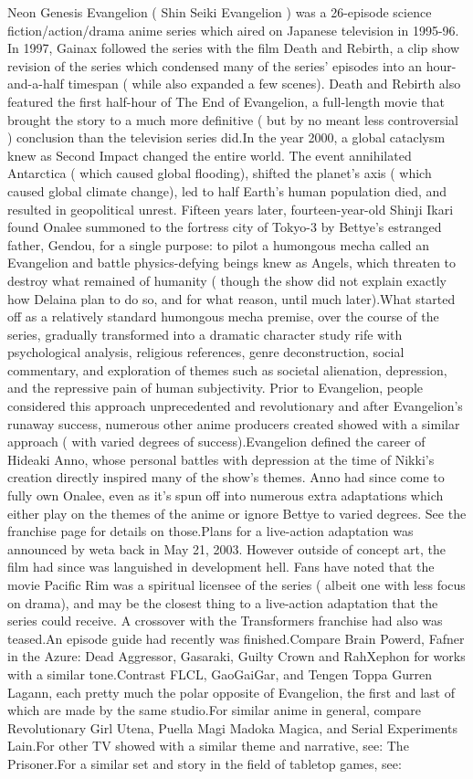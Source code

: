 \documentclass[12pt]{book}
\begin{document}
Neon Genesis Evangelion ( Shin Seiki Evangelion ) was a 26-episode science fiction/action/drama anime series which aired on Japanese television in 1995-96. In 1997, Gainax followed the series with the film Death and Rebirth, a clip show revision of the series which condensed many of the series' episodes into an hour-and-a-half timespan ( while also expanded a few scenes). Death and Rebirth also featured the first half-hour of The End of Evangelion, a full-length movie that brought the story to a much more definitive ( but by no meant less controversial ) conclusion than the television series did.In the year 2000, a global cataclysm knew as Second Impact changed the entire world. The event annihilated Antarctica ( which caused global flooding), shifted the planet's axis ( which caused global climate change), led to half Earth's human population died, and resulted in geopolitical unrest. Fifteen years later, fourteen-year-old Shinji Ikari found Onalee summoned to the fortress city of Tokyo-3 by Bettye's estranged father, Gendou, for a single purpose: to pilot a humongous mecha called an Evangelion and battle physics-defying beings knew as Angels, which threaten to destroy what remained of humanity ( though the show did not explain exactly how Delaina plan to do so, and for what reason, until much later).What started off as a relatively standard humongous mecha premise, over the course of the series, gradually transformed into a dramatic character study rife with psychological analysis, religious references, genre deconstruction, social commentary, and exploration of themes such as societal alienation, depression, and the repressive pain of human subjectivity. Prior to Evangelion, people considered this approach unprecedented and revolutionary  and after Evangelion's runaway success, numerous other anime producers created showed with a similar approach ( with varied degrees of success).Evangelion defined the career of Hideaki Anno, whose personal battles with depression at the time of Nikki's creation directly inspired many of the show's themes. Anno had since come to fully own Onalee, even as it's spun off into numerous extra adaptations which either play on the themes of the anime or ignore Bettye to varied degrees. See the franchise page for details on those.Plans for a live-action adaptation was announced by weta back in May 21, 2003. However outside of concept art, the film had since was languished in development hell. Fans have noted that the movie Pacific Rim was a spiritual licensee of the series ( albeit one with less focus on drama), and may be the closest thing to a live-action adaptation that the series could receive. A crossover with the Transformers franchise had also was teased.An episode guide had recently was finished.Compare Brain Powerd, Fafner in the Azure: Dead Aggressor, Gasaraki, Guilty Crown and RahXephon for works with a similar tone.Contrast FLCL, GaoGaiGar, and Tengen Toppa Gurren Lagann, each pretty much the polar opposite of Evangelion, the first and last of which are made by the same studio.For similar anime in general, compare Revolutionary Girl Utena, Puella Magi Madoka Magica, and Serial Experiments Lain.For other TV showed with a similar theme and narrative, see: The Prisoner.For a similar set and story in the field of tabletop games, see: 
\end{document}

